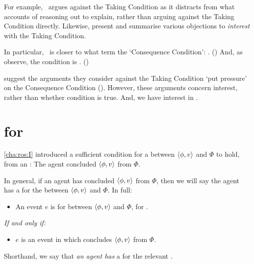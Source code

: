 \begin{note}
{    For example,~\citeauthor{Hlobil:2014tq} argues against the Taking Condition as it distracts from what accounts of reasoning out to explain, rather than arguing against the Taking Condition directly.
    Likewise, \citeauthor{McHugh:2016vp} present and summarise various objections to \emph{interest} with the Taking Condition.

    In particular,~\supportI{} is closer to what \citeauthor{McHugh:2016vp} term the `Consequence Condition': .
    (\citeyear[316]{McHugh:2016vp})
    And, as \citeauthor{McHugh:2016vp} observe, the condition is .
    (\citeyear[316]{McHugh:2016vp})

    \citeauthor{McHugh:2016vp} suggest the arguments they consider against the Taking Condition `put pressure' on the Consequence Condition (\citeyear[327]{McHugh:2016vp}).
    However, these arguments concern interest, rather than whether condition is true.
    And, we have interest in .
  }
\end{note}

\section{ for }
\label{cha:ros:W}

\begin{note}
  \autoref{cha:ros:I} introduced a sufficient condition for a \ros{} between \(\langle \phi, v \rangle\) and \(\Phi\) to hold, from an \agpe{}:
  The agent concluded \(\langle \phi, v \rangle\) from \(\Phi\).

  In general, if an agent has concluded \(\langle \phi, v \rangle\) from \(\Phi\), then we will say the agent has a \wit{} for the \ros{} between \(\langle \phi, v \rangle\) and \(\Phi\).
  In full:

  \begin{definition}%
    \label{def:witnessing}%
    \vspace{-\baselineskip}
    \begin{itemize}
    \item
      An event \(e\) is \emph{} for \ros{} between \(\langle \phi, v \rangle\) and \(\Phi\), for \vAgent{}.
    \end{itemize}

    \emph{If and only if:}

    \begin{itemize}
    \item
      \(e\) is an event in which \vAgent{} concludes \(\langle \phi, v \rangle\) from \(\Phi\).
    \end{itemize}
    \vspace{-\baselineskip}
  \end{definition}

  Shorthand, we say that \emph{an agent has} a  for the relevant \ros{}.
\end{note}

